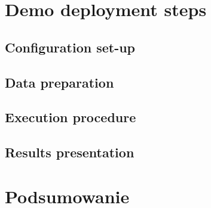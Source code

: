 \documentclass[onecolumn,12pt]{article}
\begin{document}
\section{Demo deployment steps}

\subsection{Configuration set-up}
\subsection{Data preparation}
\subsection{Execution procedure}
\subsection{Results presentation}

\section{Podsumowanie}

%
\end{document}
